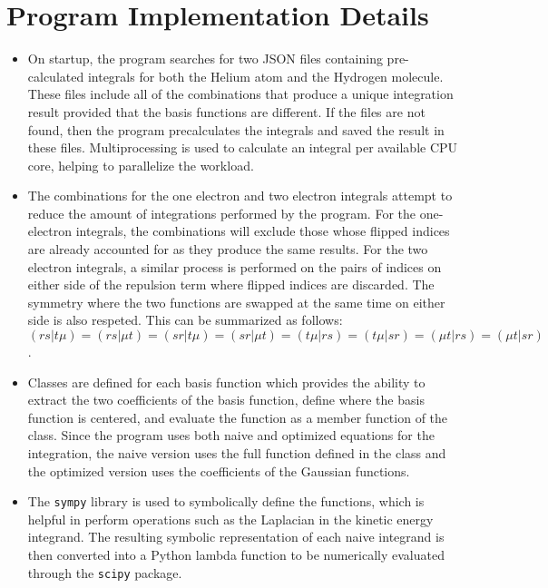 \documentclass[10pt, oneside, letterpaper]{article}
\begin{document}
\newpage
\section{Program Implementation Details}

\begin{itemize}
  \item On startup, the program searches for two JSON files containing pre-calculated integrals for both the Helium atom and the Hydrogen molecule. These files include all of the combinations that produce a unique integration result provided that the basis functions are different. If the files are not found, then the program precalculates the integrals and saved the result in these files. Multiprocessing is used to calculate an integral per available CPU core, helping to parallelize the workload.
  \item The combinations for the one electron and two electron integrals attempt to reduce the amount of integrations performed by the program. For the one-electron integrals, the combinations will exclude those whose flipped indices are already accounted for as they produce the same results. For the two electron integrals, a similar process is performed on the pairs of indices on either side of the repulsion term where flipped indices are discarded. The symmetry where the two functions are swapped at the same time on either side is also respeted. This can be summarized as follows:
  $(rs|t\mu) = (rs|\mu t) = (sr|t\mu) = (sr|\mu t) = (t\mu|rs) = (t\mu|sr) = (\mu t|rs) = (\mu t|sr)$ \cite{hartree-fock-in-100-lines}.
  \item Classes are defined for each basis function which provides the ability to extract the two coefficients of the basis function, define where the basis function is centered, and evaluate the function as a member function of the class. Since the program uses both naive and optimized equations for the integration, the naive version uses the full function defined in the class and the optimized version uses the coefficients of the Gaussian functions.
  \item The \texttt{sympy} library is used to symbolically define the functions, which is helpful in perform operations such as the Laplacian in the kinetic energy integrand. The resulting symbolic representation of each naive integrand is then converted into a Python lambda function to be numerically evaluated through the \texttt{scipy} package.
\end{itemize}

\end{document}
